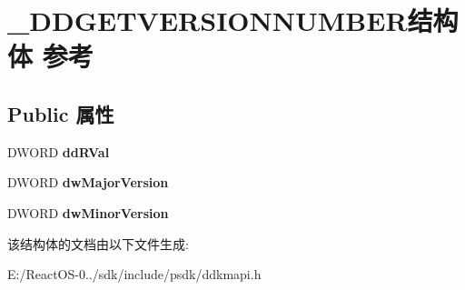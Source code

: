 \hypertarget{struct___d_d_g_e_t_v_e_r_s_i_o_n_n_u_m_b_e_r}{}\section{\+\_\+\+D\+D\+G\+E\+T\+V\+E\+R\+S\+I\+O\+N\+N\+U\+M\+B\+E\+R结构体 参考}
\label{struct___d_d_g_e_t_v_e_r_s_i_o_n_n_u_m_b_e_r}
\subsection*{Public 属性}
\begin{DoxyCompactItemize}
\item 
\mbox{\label{struct___d_d_g_e_t_v_e_r_s_i_o_n_n_u_m_b_e_r_a416f72e44676269d55285d3164baa310}} 
D\+W\+O\+RD {\bfseries dd\+R\+Val}
\item 
\mbox{\label{struct___d_d_g_e_t_v_e_r_s_i_o_n_n_u_m_b_e_r_a6dffac8fb17498dbf6b7e88c2ed083b6}} 
D\+W\+O\+RD {\bfseries dw\+Major\+Version}
\item 
\mbox{\label{struct___d_d_g_e_t_v_e_r_s_i_o_n_n_u_m_b_e_r_a9dd812050593a387eef1e7541a93985c}} 
D\+W\+O\+RD {\bfseries dw\+Minor\+Version}
\end{DoxyCompactItemize}


该结构体的文档由以下文件生成\+:\begin{DoxyCompactItemize}
\item 
E\+:/\+React\+O\+S-\/0../sdk/include/psdk/ddkmapi.\+h\end{DoxyCompactItemize}
